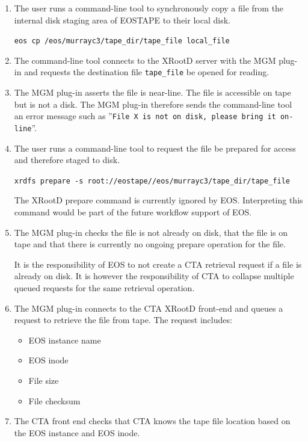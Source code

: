 \documentclass{article}
\begin{document}
\begin{enumerate}
\item The user runs a command-line tool to synchronously copy a file from the internal disk staging area of EOSTAPE to their local disk.

\texttt{eos cp /eos/murrayc3/tape\_dir/tape\_file local\_file}

\item The command-line tool connects to the XRootD server with the MGM plug-in and requests the destination file \texttt{tape\_file} be opened for reading.

\item The MGM plug-in asserts the file is near-line.  The file is accessible on tape but is not a disk.  The MGM plug-in therefore sends the command-line tool an error message such as ''\texttt{File X is not on disk, please bring it on-line}''.

\item The user runs a command-line tool to request the file be prepared for access and therefore staged to disk.

\texttt{xrdfs prepare -s root://eostape//eos/murrayc3/tape\_dir/tape\_file}

The XRootD prepare command is currently ignored by EOS.  Interpreting this command would be part of the future workflow support of EOS.

\item The MGM plug-in checks the file is not already on disk, that the file is on tape and that there is currently no ongoing prepare operation for the file.

It is the responsibility of EOS to not create a CTA retrieval request if a file is already on disk.  It is however the responsibility of CTA to collapse multiple queued requests for the same retrieval operation.

\item The MGM plug-in connects to the CTA XRootD front-end and queues a request to retrieve the file from tape.  The request includes:
\begin{itemize}
	\item EOS instance name
	\item EOS inode
	\item File size
	\item File checksum
\end{itemize}

\item The CTA front end checks that CTA knows the tape file location based on the EOS instance and EOS inode.


\end{enumerate}
\end{document}
